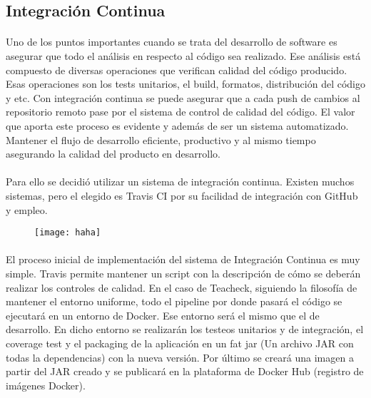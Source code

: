 \subsection{Integración Continua}
\paragraph{}
Uno de los puntos importantes cuando se trata del desarrollo de
software es asegurar que todo el análisis en respecto al código sea
realizado. Ese análisis está compuesto de diversas operaciones que
verifican calidad del código producido. Esas operaciones son los tests
unitarios, el build, formatos, distribución del código y etc. Con
integración continua se puede asegurar que a cada push de cambios al
repositorio remoto pase por el sistema de control de calidad del
código. El valor que aporta este proceso es evidente y además de ser
un sistema automatizado. Mantener el flujo de desarrollo eficiente,
productivo y al mismo tiempo asegurando la calidad del producto en
desarrollo.

\paragraph{}
Para ello se decidió utilizar un sistema de integración
continua. Existen muchos sistemas, pero el elegido es Travis CI por su
facilidad de integración con GitHub y empleo.
\begin{figure}
  \texttt{[image: haha]}
\end{figure}
\paragraph{}
El proceso inicial de implementación del sistema de Integración
Continua es muy simple. Travis permite mantener un script con la
descripción de cómo se deberán realizar los controles de calidad. En
el caso de Teacheck, siguiendo la filosofía de mantener el entorno
uniforme, todo el pipeline por donde pasará el código se ejecutará en
un entorno de Docker. Ese entorno será el mismo que el de
desarrollo. En dicho entorno se realizarán los testeos unitarios y de
integración, el coverage test y el packaging de la aplicación en un
fat jar (Un archivo JAR con todas la dependencias) con la nueva
versión. Por último se creará una imagen a partir del JAR creado y se
publicará en la plataforma de Docker Hub (registro de imágenes
Docker).

